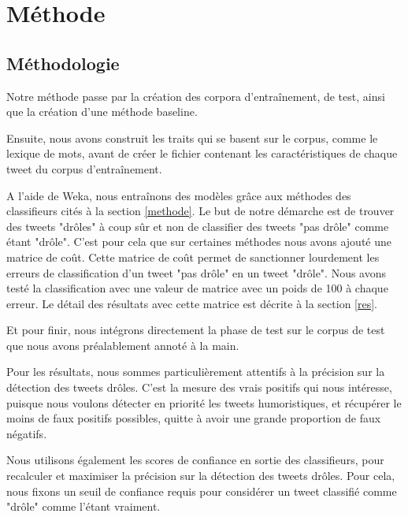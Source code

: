\documentclass[10pt,a4paper,twoside]{article}
\begin{document}
\section{Méthode}
\label{methClass}

\subsection{Méthodologie}
Notre méthode passe par la création des corpora d'entraînement, de test, ainsi que la création d'une méthode baseline.

Ensuite, nous avons construit les traits qui se basent sur le corpus, comme le lexique de mots, avant de créer le fichier contenant les caractéristiques de chaque tweet du corpus d'entraînement.

A l'aide de Weka, nous entraînons des modèles grâce aux méthodes des classifieurs cités à la section \ref{methode}. Le but de notre démarche est de trouver des tweets "drôles" à coup sûr et non de classifier des tweets "pas drôle" comme étant "drôle". C'est pour cela que sur certaines méthodes nous avons ajouté une matrice de coût. Cette matrice de coût permet de sanctionner lourdement les erreurs de classification d'un tweet "pas drôle" en un tweet "drôle". Nous avons testé la classification avec une valeur de matrice avec un poids de 100 à chaque erreur. Le détail des résultats avec cette matrice est décrite à la section \ref{res}.

Et pour finir, nous intégrons directement la phase de test sur le corpus de test que nous avons préalablement annoté à la main.

Pour les résultats, nous sommes particulièrement attentifs à la précision sur la détection des tweets drôles. C'est la mesure des vrais positifs qui nous intéresse, puisque nous voulons détecter en priorité les tweets humoristiques, et récupérer le moins de faux positifs possibles, quitte à avoir une grande proportion de faux négatifs.

Nous utilisons également les scores de confiance en sortie des classifieurs, pour recalculer et maximiser la précision sur la détection des tweets drôles. Pour cela, nous fixons un seuil de confiance requis pour considérer un tweet classifié comme "drôle" comme l'étant vraiment. 
\end{document}
